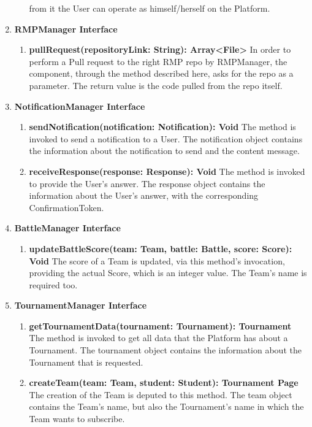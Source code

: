 \begin{enumerate}
\begin{enumerate}[label=$\bullet$]
            from it the User can operate as himself/herself on the Platform.
        \end{enumerate}
    \item \textbf{RMPManager Interface}
        \begin{enumerate}[label=$\bullet$]
            \item \textbf{pullRequest(repositoryLink: String): Array<File>} In order to perform a Pull request to the right RMP repo by RMPManager, the component, through the method described here, asks for the repo as a parameter. The return 
            value is the code pulled from the repo itself.
        \end{enumerate} 
    \item \textbf{NotificationManager Interface}
        \begin{enumerate}[label=$\bullet$]
            \item \textbf{sendNotification(notification: Notification): Void} The method is invoked to send a notification to a User. The notification object contains the information about the notification to send and the content
            message.
            \item \textbf{receiveResponse(response: Response): Void} The method is invoked to provide the User's answer. The response object contains the information about the User's answer, with the corresponding ConfirmationToken.
        \end{enumerate}
    \item \textbf{BattleManager Interface}
        \begin{enumerate}[label=$\bullet$]
            \item \textbf{updateBattleScore(team: Team, battle: Battle, score: Score): Void} The score of a Team is updated, via this method's invocation, providing the actual Score, which is an integer value. The Team's name is required too.
        \end{enumerate}
    \item \textbf{TournamentManager Interface}
        \begin{enumerate}[label=$\bullet$]
            \item \textbf{getTournamentData(tournament: Tournament): Tournament} The method is invoked to get all data that the Platform has about a Tournament. The tournament object contains the information about the Tournament that 
            is requested.
            \item \textbf{createTeam(team: Team, student: Student): Tournament Page} The creation of the Team is deputed to this method. The team object contains the Team's name, but also the Tournament's name in which the Team wants to subscribe. 

\end{enumerate}
\end{enumerate}
